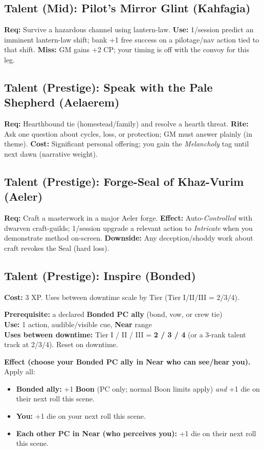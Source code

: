 \subsection{Talent (Mid): Pilot's Mirror Glint (Kahfagia)}
\textbf{Req:} Survive a hazardous channel using lantern-law.
\textbf{Use:} 1/session predict an imminent lantern-law shift; bank +1 free success on a pilotage/nav action tied to that shift.
\textbf{Miss:} GM gains +2 CP; your timing is off with the convoy for this leg.

\subsection{Talent (Prestige): Speak with the Pale Shepherd (Aelaerem)}
\textbf{Req:} Hearthbound tie (homestead/family) and resolve a hearth threat.
\textbf{Rite:} Ask one question about cycles, loss, or protection; GM must answer plainly (in theme).
\textbf{Cost:} Significant personal offering; you gain the \emph{Melancholy} tag until next dawn (narrative weight).

\subsection{Talent (Prestige): Forge-Seal of Khaz-Vurim (Aeler)}
\textbf{Req:} Craft a masterwork in a major Aeler forge.
\textbf{Effect:} Auto-\emph{Controlled} with dwarven craft-guilds; 1/session upgrade a relevant action to \emph{Intricate} when you demonstrate method on-screen.
\textbf{Downside:} Any deception/shoddy work about craft revokes the Seal (hard loss).

\subsection{Talent (Prestige): Inspire (Bonded)}
\textbf{Cost:} 3 XP. Uses between downtime scale by Tier (Tier I/II/III = 2/3/4).

\textbf{Prerequisite:} a declared \textbf{Bonded PC ally} (bond, vow, or crew tie) \\
\textbf{Use:} 1 action, audible/visible cue, \textbf{Near} range \\
\textbf{Uses between downtime:} Tier I / II / III = \textbf{2 / 3 / 4} (or a 3-rank talent track at 2/3/4). Reset on downtime.

\textbf{Effect (choose your Bonded PC ally in Near who can see/hear you).}
Apply all:
\begin{itemize}
  \item \textbf{Bonded ally:} +1 \textbf{Boon} (PC only; normal Boon limits apply) \emph{and} +1 die on their next roll this scene.
  \item \textbf{You:} +1 die on your next roll this scene.
  \item \textbf{Each other PC in Near (who perceives you):} +1 die on their next roll this scene.
\end{itemize}

